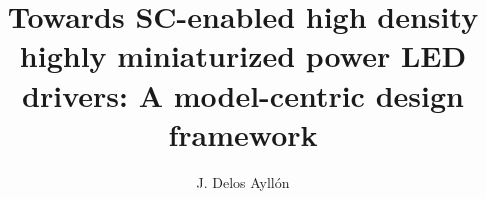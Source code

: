 \documentclass{book}
\begin{document}
\title{Towards SC-enabled high density highly miniaturized power LED drivers: A model-centric design framework}


\author{J. Delos Ayllón \\
}


\maketitle

\tableofcontents
\listoffigures
\listoftables





%
%
\label{ch:h_scc}



%


%
%

%
%
%
%
%
%
%

%
%

\begin{appendices}
\appendixpage
\noappendicestocpagenum
\addappheadtotoc


\end{appendices}
\end{document}
